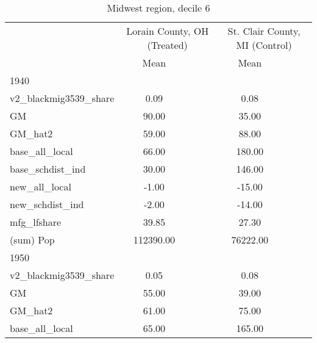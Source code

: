 \begin{table}[htbp]\centering
\def\sym#1{\ifmmode^{#1}\else\(^{#1}\)\fi}
\caption{Midwest region, decile 6 \label{tab1}}
\begin{tabular}{l*{2}{ccc}}
\toprule
                    &\multicolumn{3}{c}{Lorain County, OH (Treated)}&\multicolumn{3}{c}{St. Clair County, MI (Control)}\\
                    &        Mean&            &            &        Mean&            &            \\
\midrule
1940                &            &            &            &            &            &            \\
v2\_blackmig3539\_share&        0.09&            &            &        0.08&            &            \\
GM                  &       90.00&            &            &       35.00&            &            \\
GM\_hat2             &       59.00&            &            &       88.00&            &            \\
base\_all\_local      &       66.00&            &            &      180.00&            &            \\
base\_schdist\_ind    &       30.00&            &            &      146.00&            &            \\
new\_all\_local       &       -1.00&            &            &      -15.00&            &            \\
new\_schdist\_ind     &       -2.00&            &            &      -14.00&            &            \\
mfg\_lfshare         &       39.85&            &            &       27.30&            &            \\
(sum) Pop           &   112390.00&            &            &    76222.00&            &            \\
\midrule
1950                &            &            &            &            &            &            \\
v2\_blackmig3539\_share&        0.05&            &            &        0.08&            &            \\
GM                  &       55.00&            &            &       39.00&            &            \\
GM\_hat2             &       61.00&            &            &       75.00&            &            \\
base\_all\_local      &       65.00&            &            &      165.00&            &            \\

\end{tabular}
\end{table}
